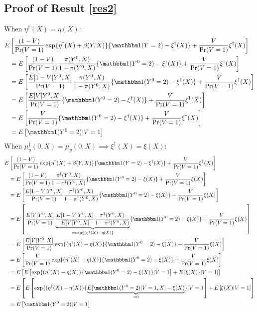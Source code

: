 \documentclass[12pt]{article}
\begin{document}
\begin{appendix}
\section{Proof of Result \ref{res2}}\label{sec:proof2}
When $\eta^\dagger(X) = \eta(X)$:
\begin{align*}
    E&\left[\dfrac{(1 - V)}{\Pr(V=1)} \exp\{\eta^\dagger(X) + \beta(Y,X)\}\{\mathbbm 1(Y = 2) - \xi^\dagger(X)\} + \dfrac{V}{\Pr(V=1)}\xi^\dagger(X) \right]\\
     &= E\left[\dfrac{(1 - V)}{\Pr(V=1)}  \dfrac{\pi(Y^0,X)}{1-\pi(Y^0,X)} \{\mathbbm 1(Y^0 = 2) - \xi^\dagger(X)\}  + \dfrac{V}{\Pr(V=1)}\xi^\dagger(X)\right] \\
      &= E\left[\dfrac{E[1-V|Y^0, X]}{\Pr(V=1)}  \dfrac{\pi(Y^0,X)}{1-\pi(Y^0,X)}\{\mathbbm 1(Y^0 = 2) - \xi^\dagger(X)\} + \dfrac{V}{\Pr(V=1)}\xi^\dagger(X)\right]\\
       &= E\left[\dfrac{E[V|Y^0, X]}{\Pr(V=1)} \{\mathbbm 1(Y^0 = 2) - \xi^\dagger(X)\} + \dfrac{V}{\Pr(V=1)}\xi^\dagger(X)\right] \\
       &= E\left[\dfrac{V}{\Pr(V=1)} \{\mathbbm 1(Y^0 = 2) - \xi^\dagger(X)\} + \dfrac{V}{\Pr(V=1)}\xi^\dagger(X)\right]\\
        &= E\left[\mathbbm 1(Y^0 = 2) |V=1\right]
\end{align*}
When $\mu_y^\dagger(0,X) = \mu_y(0,X) \implies \xi^\dagger(X) = \xi(X)$:
\begin{align*}
     E&\left[\dfrac{(1 - V)}{\Pr(V=1)} \exp\{\eta^\dagger(X) + \beta(Y,X)\}\{\mathbbm 1(Y = 2) - \xi^\dagger(X)\} + \dfrac{V}{\Pr(V=1)}\xi^\dagger(X) \right]\\
     &= E\left[\dfrac{(1 - V)}{\Pr(V=1)} \dfrac{\pi^\dagger(Y^0,X)}{1-\pi^\dagger(Y^0, X)}\{\mathbbm 1(Y^0 = 2) - \xi(X)\} + \dfrac{V}{\Pr(V=1)}\xi(X) \right] \\
      &= E\left[\dfrac{E[1-V|Y^0, X] }{\Pr(V=1)} \dfrac{\pi^\dagger(Y^0,X)}{1-\pi^\dagger(Y^0, X)}\{\mathbbm 1(Y^0 = 2) - \xi(X)\} + \dfrac{V}{\Pr(V=1)}\xi(X) \right] \\
      &= E\left[\dfrac{ E[V|Y^0, X]}{\Pr(V=1)}\underbrace{\dfrac{E[1-V|Y^0, X]}{E[V|Y^0, X]} \dfrac{\pi^\dagger(Y^0,X)}{1-\pi^\dagger(Y^0, X)}}_{=\exp\{(\eta^\dagger(X) - \eta(X)\}}\{\mathbbm 1(Y^0 = 2) - \xi(X)\} + \dfrac{V}{\Pr(V=1)}\xi(X) \right] \\
      &= E\left[\dfrac{ E[V|Y^0, X]}{\Pr(V=1)}\exp\{(\eta^\dagger(X) - \eta(X)\}\{\mathbbm 1(Y^0 = 2) - \xi(X)\} + \dfrac{V}{\Pr(V=1)}\xi(X) \right] \\
      &= E\left[\dfrac{V}{\Pr(V=1)}\exp\{(\eta^\dagger(X) - \eta(X)\}\{\mathbbm 1(Y^0 = 2) - \xi(X)\} + \dfrac{V}{\Pr(V=1)}\xi(X) \right] \\
      &= E\left[E\left[\exp\{(\eta^\dagger(X) - \eta(X)\}\{\mathbbm 1(Y^0 = 2) - \xi(X)\} | V = 1\right] + E\left[\xi(X)\} |V=1\right]\right] \\
      &= E\left[E\left[\exp\{(\eta^\dagger(X) - \eta(X)\}\{\underbrace{ E[\mathbbm1(Y^0 = 2)|V=1,X] - \xi(X)}_{=0}\} | V = 1\right] + E\left[\xi(X) |V=1\right]\right] \\
        &= E\left[\mathbbm1(Y^0 = 2)|V=1\right]
\end{align*}
\newpage

\end{appendix}
\end{document}
